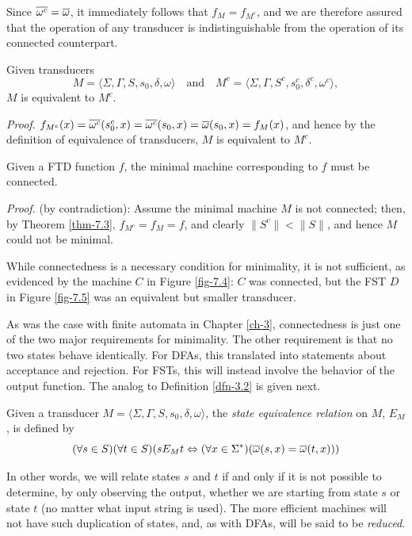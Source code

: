Since $\overline{\omega^c} = \overline{\omega}$, it immediately follows that $f_M = f_{M^c}$, and we are
therefore assured that the operation of any transducer is indistinguishable from
the operation of its connected counterpart.

\begin{thm}\label{thm-7.3}
Given transducers
\[ M=\langle\Sigma,\Gamma,S,s_0,\delta,\omega\rangle\quad\text{and}\quad
	M^c=\langle\Sigma,\Gamma,S^c,s^c_0,\delta^c,\omega^c\rangle, \]
$M$ is equivalent to $M^c$.

\emph{Proof.} $f_{M^c}(x)=\overline{\omega^c}(s^c_0,x)=\overline{\omega^c}(s_0,x)=\overline{\omega}(s_0,x)=f_M(x)$,
and hence by the definition of equivalence of transducers, $M$ is equivalent to
$M^c$.
\end{thm}

\begin{cor}\label{cor-7.2}
Given a FTD function $f$, the minimal machine corresponding to $f$ must be
connected.

\emph{Proof.} (by contradiction): Assume the minimal machine $M$ is not
connected; then, by Theorem \ref{thm-7.3}, $f_{M^c} = f_M = f$, and clearly
$\|S^c\| < \|S\|$, and hence $M$ could not be minimal.
\end{cor}

While connectedness is a necessary condition for minimality, it is not
sufficient, as evidenced by the machine $C$ in Figure \ref{fig-7.4}: $C$ was connected,
but the FST $D$ in Figure \ref{fig-7.5} was an equivalent but smaller transducer.

As was the case with finite automata in Chapter \ref{ch-3}, connectedness is just one
of the two major requirements for minimality. The other requirement is that no
two states behave identically. For DFAs, this translated into statements about
acceptance and rejection. For FSTs, this will instead involve the behavior of
the output function. The analog to Definition \ref{dfn-3.2} is given next.

\begin{dfn}\label{dfn-7.12}
Given a transducer $M=\langle\Sigma,\Gamma,S,s_0,\delta,\omega\rangle$, the
\emph{state equivalence relation} on $M$, $E_M$, is defined by
\[ (\forall s \in S)(\forall t \in S)(s E_M t \Leftrightarrow
	(\forall x \in \Sigma^*)(\overline{\omega}(s,x) = \overline{\omega}(t, x))) \]
\end{dfn}

In other words, we will relate states $s$ and $t$ if and only if it is not
possible to determine, by only observing the output, whether we are starting
from state $s$ or state $t$ (no matter what input string is used). The more
efficient machines will not have such duplication of states, and, as with DFAs,
will be said to be \emph{reduced}.

